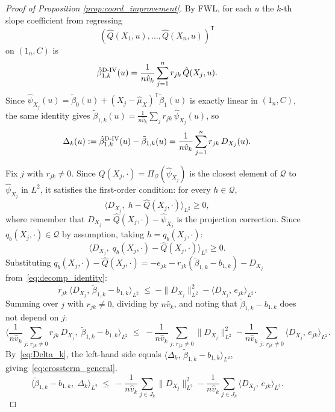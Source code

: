 \documentclass[12pt]{article}
\newcommand{\T}{\mathsf{T}} %
\newcommand{\est}{\ensuremath{\textnormal{D-IV}}\xspace}
\begin{document}
\begin{proof}[Proof of Proposition \ref{prop:coord_improvement}]
By FWL, for each $u$ the $k$-th slope coefficient from regressing \[(\hat{Q}(X_1,u),\ldots,\hat{Q}(X_n,u))^{\!\T}\] on $(1_n,C)$ is
\[
\hat\beta_{1,k}^{\est}(u)
=\frac{1}{n\hat v_k}\sum_{j=1}^n r_{jk}\,\hat{Q}(X_j,u).
\]
Since $\hat\psi_{X_j}(u)=\tilde\beta_0(u)+(X_j-\hat\mu_X)^{\!\T}\tilde\beta_1(u)$ is exactly linear in $(1_n,C)$, the same identity gives $\tilde\beta_{1,k}(u)=\frac{1}{n\hat v_k}\sum_j r_{jk}\,\hat\psi_{X_j}(u)$, so
\begin{equation}\label{eq:Delta_k}
\Delta_k(u):=\hat\beta_{1,k}^{\est}(u)-\tilde\beta_{1,k}(u)=\frac{1}{n\hat v_k}\sum_{j=1}^n r_{jk}\,D_{X_j}(u).
\end{equation}

Fix $j$ with $r_{jk}\neq 0$. Since $\hat{Q}(X_j,\cdot)=\Pi_{\mathcal Q}(\hat\psi_{X_j})$ is the closest element of $\mathcal Q$ to $\hat\psi_{X_j}$ in $L^2$, it satisfies the first-order condition: for every $h\in\mathcal Q$,
\[
\langle D_{X_j},\; h-\hat{Q}(X_j,\cdot)\rangle_{L^2}\ge 0,
\]
where remember that $D_{X_j}=\hat{Q}(X_j,\cdot)-\hat\psi_{X_j}$ is the projection correction. Since $q_b(X_j,\cdot)\in\mathcal Q$ by assumption, taking $h=q_b(X_j,\cdot)$:
\[
\langle D_{X_j},\; q_b(X_j,\cdot)-\hat{Q}(X_j,\cdot)\rangle_{L^2}\ge 0.
\]
Substituting $q_b(X_j,\cdot)-\hat{Q}(X_j,\cdot)=-e_{jk}-r_{jk}(\tilde\beta_{1,k}-b_{1,k})-D_{X_j}$ from~\eqref{eq:decomp_identity}:
\begin{equation}\label{eq:vi_unconditional}
r_{jk}\,\langle D_{X_j},\,\tilde\beta_{1,k}-b_{1,k}\rangle_{L^2}
\;\le\;
-\|D_{X_j}\|_{L^2}^2 - \langle D_{X_j},\,e_{jk}\rangle_{L^2}.
\end{equation}
Summing over $j$ with $r_{jk}\neq 0$, dividing by $n\hat v_k$, and noting that $\tilde\beta_{1,k}-b_{1,k}$ does not depend on $j$:
\[
\Big\langle \frac{1}{n\hat v_k}\sum_{j:\,r_{jk}\neq 0} r_{jk}\,D_{X_j},\;\tilde\beta_{1,k}-b_{1,k}\Big\rangle_{L^2}
\;\le\;
-\frac{1}{n\hat v_k}\sum_{j:\,r_{jk}\neq 0}\|D_{X_j}\|_{L^2}^2
-\frac{1}{n\hat v_k}\sum_{j:\,r_{jk}\neq 0}\langle D_{X_j},\,e_{jk}\rangle_{L^2}.
\]
By~\eqref{eq:Delta_k}, the left-hand side equals $\langle\Delta_k,\,\tilde\beta_{1,k}-b_{1,k}\rangle_{L^2}$, giving~\eqref{eq:crossterm_general}.
\begin{equation}\label{eq:crossterm_general}
\langle\tilde\beta_{1,k}-b_{1,k},\;\Delta_k\rangle_{L^2}
\;\le\;
-\frac{1}{n\hat v_k}\sum_{j\in J_k}\|D_{X_j}\|_{L^2}^2
-\frac{1}{n\hat v_k}\sum_{j\in J_k}\langle D_{X_j},\,e_{jk}\rangle_{L^2}.

\end{equation}
\end{proof}
\end{document}
